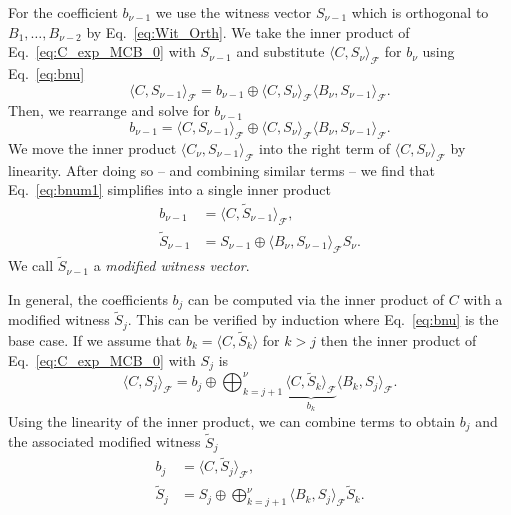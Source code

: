 \documentclass[fleqn,11pt]{article}
\newcommand\calF{\mathcal{F}}
\begin{document}
For the coefficient $b_{\nu-1}$ we use the witness vector $S_{\nu-1}$ which is orthogonal to $B_1,\hdots,B_{\nu-2}$ by Eq.~\eqref{eq:Wit_Orth}. We take the inner product of Eq.~\eqref{eq:C_exp_MCB_0} with $S_{\nu-1}$ and substitute $\langle C,S_\nu\rangle_\calF$ for $b_\nu$ using Eq.~\eqref{eq:bnu}
\begin{equation}
	\langle C,S_{\nu-1}\rangle_\calF = b_{\nu-1} \oplus \langle C,S_\nu\rangle_\calF \langle B_\nu,S_{\nu-1}\rangle_\calF.
\end{equation}
Then, we rearrange and solve for $b_{\nu-1}$
\begin{equation}
	b_{\nu-1} = \langle C,S_{\nu-1}\rangle_\calF \oplus \langle C,S_\nu\rangle_\calF \langle B_\nu,S_{\nu-1}\rangle_\calF.\label{eq:bnum1}
\end{equation}
We move the inner product $\langle C_\nu,S_{\nu-1}\rangle_\calF$ into the right term of $\langle C,S_\nu\rangle_\calF$ by linearity. After doing so -- and combining similar terms -- we find that Eq.~\eqref{eq:bnum1} simplifies into a single inner product
\begin{align}
	b_{\nu-1} &= \langle C, \tilde{S}_{\nu-1}\rangle_\calF,\\ \tilde{S}_{\nu-1} &= S_{\nu-1}\oplus\langle B_\nu,S_{\nu-1}\rangle_\calF S_\nu.
\end{align}
We call $\tilde{S}_{\nu-1}$ a \emph{modified witness vector}.

In general, the coefficients $b_j$ can be computed via the inner product of $C$ with a modified witness $\tilde{S}_j$. This can be verified by induction where Eq.~\eqref{eq:bnu} is the base case. If we assume that $b_k = \langle C,\tilde{S}_k\rangle$ for $k>j$ then the inner product of Eq.~\eqref{eq:C_exp_MCB_0} with $S_j$ is
\begin{equation}
	\langle C,S_j\rangle_\calF = b_j\oplus\bigoplus_{{k=j+1}}^\nu \underbrace{\langle C,\tilde{S}_k\rangle_\calF}_{b_k} \langle B_k,S_j\rangle_\calF .
\end{equation}
Using the linearity of the inner product, we can combine terms to obtain $b_j$ and the associated modified witness $\tilde{S}_j$
\begin{align}
	b_j &= \langle C,\tilde{S}_j\rangle_\calF,\\ \tilde{S}_j&= S_j\oplus\bigoplus_{{k=j+1}}^\nu\langle B_k,S_j\rangle_\calF \tilde{S}_k.\label{eq:mod_wit}
\end{align}
\end{document}
